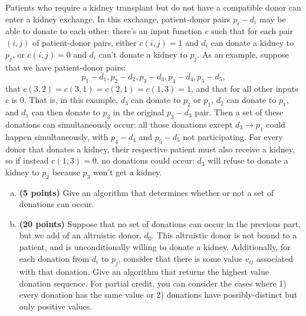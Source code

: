 \documentclass[11pt,letterpaper]{article}
\begin{document}
\pagebreak
\begin{problem}
    Patients who require a kidney transplant but do not have a compatible donor can enter a kidney exchange. In this exchange, patient-donor pairs $p_i-d_i$ may be able to donate to each other: there's an input function $c$ such that for each pair $(i,j)$ of patient-donor pairs, either $c(i,j) = 1$ and $d_i$ can donate a kidney to $p_j$, or $c(i,j) = 0$ and $d_i$ can't donate a kidney to $p_j$. As an example, suppose that we have patient-donor pairs: $$p_1-d_1, p_2-d_2, p_3-d_3, p_4-d_4, p_5-d_5,$$  that $c(3,2) = c(3,1) = c(2,1) = c(1,3) = 1$, and that for all other inputs $c$ is 0. That is, in this example, $d_3$ can donate to $p_2$ or $p_1$, $d_2$ can donate to $p_1$, and $d_1$ can then donate to $p_3$ in the original $p_3-d_3$ pair. Then a set of these donations can simultaneously occur: all those donations except $d_3 \to p_1$ could happen simultaneously, with $p_4- d_4$ and $p_5-d_5$ not participating. For every donor that donates a kidney, their respective patient must also receive a kidney, so if instead $c(1,3) = 0$, no donations could occur: $d_3$ will refuse to donate a kidney to $p_2$ because $p_3$ won't get a kidney.
    \begin{enumerate}[(a)]
        \item {\bf (5 points)} Give an algorithm that determines whether or not a set of donations can occur. 
        \item {\bf (20 points)} Suppose that no set of donations can occur in the previous part, but we add of an altruistic donor, $d_0$. This altruistic donor is not bound to a patient, and is unconditionally willing to donate a kidney.  Additionally, for each donation from $d_i$ to $p_j$, consider that there is some value $v_{ij}$ associated with that donation. Give an algorithm that returns the highest value donation sequence. For partial credit, you can consider the cases where 1) every donation has the same value or 2) donations have possibly-distinct but only positive values. 
        \end{enumerate} 
\end{problem}
\end{document}
